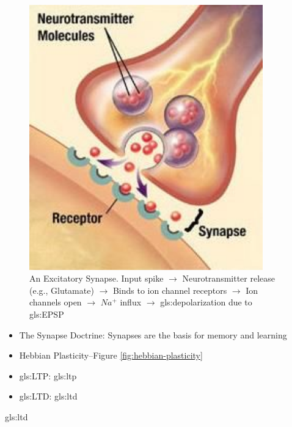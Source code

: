 \documentclass[]{article}
\begin{document}
\begin{figure}[H]
	\caption[An Excitatory Synapse]{An Excitatory Synapse. Input spike  $\rightarrow$
		Neurotransmitter 	release (e.g., Glutamate)  $\rightarrow$ Binds to ion channel receptors $\rightarrow$ Ion channels open $\rightarrow$ $Na^+$ influx  $\rightarrow$ 	\Gls{gls:depolarization} due to \gls{gls:EPSP}}
	\includegraphics[width=0.9\textwidth]{synapse4}
\end{figure}

\begin{itemize}
	\item The Synapse Doctrine: Synapses are the basis for memory and learning
	\item Hebbian Plasticity--Figure \ref{fig:hebbian-plasticity}
	\item \acrfull{gls:LTP}:  \glsdesc{gls:ltp}
	\item \acrfull{gls:LTD}:  \glsdesc{gls:ltd}
\end{itemize}

\glsdesc{gls:ltd}
\end{document}
